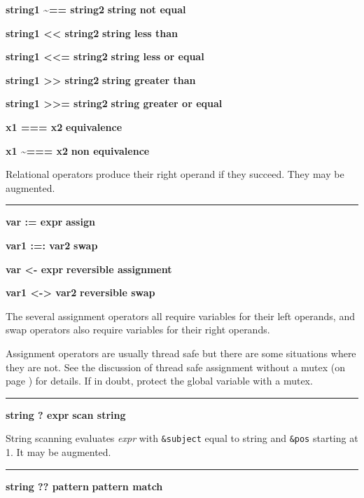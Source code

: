 \noindent
{\bf string1 \~{}== string2 } \hfill {\bf string not equal}

\noindent
{\bf string1 {\textless}{\textless} string2 } \hfill {\bf string less than}

\noindent
{\bf string1 {\textless}{\textless}= string2 } \hfill {\bf string less or equal}

\noindent
{\bf string1 {\textgreater}{\textgreater} string2 } \hfill {\bf string greater than}

\noindent
{\bf string1 {\textgreater}{\textgreater}= string2 } \hfill {\bf string greater or equal}

\noindent
{\bf x1 === x2 } \hfill {\bf equivalence}

\noindent
{\bf x1 \~{}=== x2 } \hfill {\bf non equivalence}

\noindent
Relational operators produce their right operand if they succeed. They
may be augmented.

\bigskip\hrule\vspace{0.1cm}

\noindent
{\bf var := expr } \hfill {\bf assign}

\noindent
{\bf var1 :=: var2 } \hfill {\bf swap}\WarningNotThreadSafe
{}

\noindent
{\bf var {\textless}- expr } \hfill {\bf reversible assignment}

\noindent
{\bf var1 {\textless}-{\textgreater} var2 } \hfill {\bf reversible swap}\WarningNotThreadSafe
{}

\noindent
The several assignment
operators all require variables for their left operands, and swap
operators also require variables for their right operands.

Assignment operators are usually thread safe \ConcurrencyIssue
but there are some situations where they are not. 
See the discussion of thread safe assignment without a mutex (on page
\pageref{ThreadSafeAssignment}) for details. If in doubt, protect the
global variable with a mutex.

\bigskip\hrule\vspace{0.1cm}
\noindent
{\bf string ? expr } \hfill {\bf scan string}

\noindent
{}String scanning evaluates \textit{expr}
with \texttt{\&subject} equal to string and \texttt{\&pos} starting at
1. It may be augmented.

\bigskip\hrule\vspace{0.1cm}
\noindent
{\bf string ?? pattern } \hfill {\bf pattern match}

